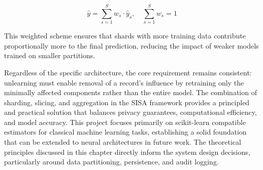 \[
\hat{y} = \sum_{s=1}^{S} w_s \cdot \hat{y}_s, \quad \sum_{s=1}^{S} w_s = 1
\]

This weighted scheme ensures that shards with more training data contribute proportionally more to the final prediction, reducing the impact of weaker models trained on smaller partitions.

Regardless of the specific architecture, the core requirement remains consistent: unlearning must enable removal of a record's influence by retraining only the minimally affected components rather than the entire model. The combination of sharding, slicing, and aggregation in the SISA framework provides a principled and practical solution that balances privacy guarantees, computational efficiency, and model accuracy. This project focuses primarily on scikit-learn compatible estimators for classical machine learning tasks, establishing a solid foundation that can be extended to neural architectures in future work. The theoretical principles discussed in this chapter directly inform the system design decisions, particularly around data partitioning, persistence, and audit logging.
